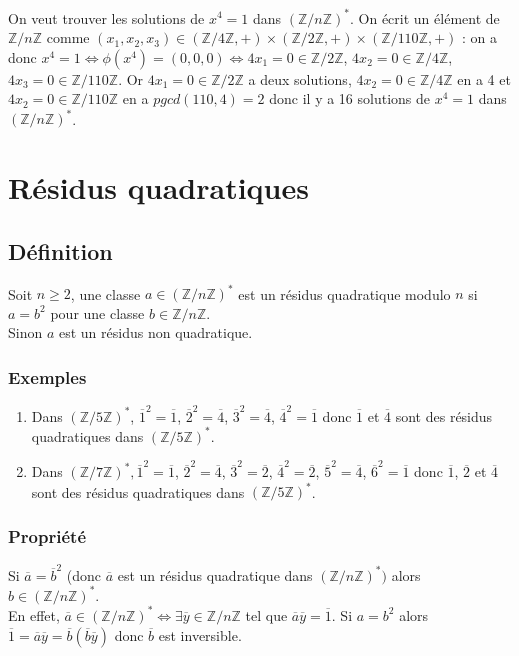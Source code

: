 \documentclass[a4paper,10pt]{book} %
\newcommand{\Z}{\mathbb{Z}}
\begin{document}
On veut trouver les solutions de $x^4=1$ dans $(\Z/n\Z)^*$.
On écrit un élément de $\Z/n\Z$ comme $(x_1,x_2,x_3)\in (\Z/4\Z,+)\times (\Z/2\Z,+)\times (\Z/110\Z,+)$ : on a donc $x^4=1\Leftrightarrow\phi(x^4)=(0,0,0) \Leftrightarrow 4x_1=0\in \Z/2\Z$, $4x_2=0\in \Z/4\Z$, $4x_3=0\in \Z/110\Z$.
Or $4x_1=0\in \Z/2\Z$ a deux solutions, $4x_2=0\in \Z/4\Z$ en a 4 et $4x_2=0\in \Z/110\Z$ en a $pgcd(110,4)=2$ donc il y a 16 solutions de $x^4=1$ dans $(\Z/n\Z)^*$.

\newpage

\section{Résidus quadratiques}
\subsection{Définition}
Soit $n\geq 2$, une classe $a\in (\Z/n\Z)^*$ est un résidus quadratique modulo $n$ si $a=b^2$ pour une classe $b\in \Z/n\Z$.\\

Sinon $a$ est un résidus non quadratique.

\subsubsection{Exemples}
\begin{enumerate}
\item Dans $(\Z/5\Z)^*$, $\overline{1}^2=\overline{1}$, $\overline{2}^2=\overline{4}$, $\overline{3}^2=\overline{4}$, $\overline{4}^2=\overline{1}$ donc $\overline{1}$ et $\overline{4}$ sont des résidus quadratiques dans $(\Z/5\Z)^*$.
\item Dans $(\Z/7\Z)^*, \overline{1}^2=\overline{1}$, $\overline{2}^2=\overline{4}$, $\overline{3}^2=\overline{2}$, $\overline{4}^2=\overline{2}$, $\overline{5}^2=\overline{4}$, $\overline{6}^2=\overline{1}$ donc $\overline{1}$, $\overline{2}$ et $\overline{4}$ sont des résidus quadratiques dans $(\Z/5\Z)^*$.
\end{enumerate}

\subsubsection{Propriété}
Si $\overline{a}=\overline{b}^2$ (donc $\overline{a}$ est un résidus quadratique dans $(\Z/n\Z)^*)$ alors $b\in (\Z/n\Z)^*$.\\

En effet, $\overline{a}\in (\Z/n\Z)^*\Leftrightarrow \exists \overline{y}\in \Z/n\Z$ tel que $\overline{a}\overline{y}=\overline{1}$. Si $a=b^2$ alors $\overline{1}=\overline{a}\overline{y}=\overline{b}(\overline{b}\overline{y})$ donc $\overline{b}$ est inversible.
\end{document}
